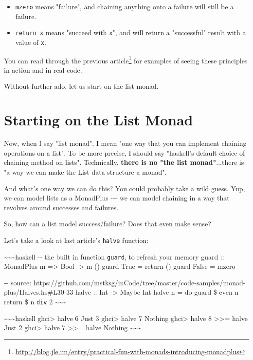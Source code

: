 \documentclass[]{article}
\renewcommand{\href}[2]{#2\footnote{\url{#1}}}
\begin{document}
\begin{itemize}
\tightlist
\item
  \texttt{mzero} means "failure", and chaining anything onto a failure will
  still be a failure.
\item
  \texttt{return\ x} means "succeed with \texttt{x}", and will return a
  "successful" result with a value of \texttt{x}.
\end{itemize}

You can read through the
\href{http://blog.jle.im/entry/practical-fun-with-monads-introducing-monadplus}{previous
article} for examples of seeing these principles in action and in real code.

Without further ado, let us start on the list monad.

\section{Starting on the List Monad}

Now, when I say "list monad", I mean "one way that you can implement chaining
operations on a list". To be more precise, I should say "haskell's default
choice of chaining method on lists". Technically, \textbf{there is no "the list
monad"}...there is "a way we can make the List data structure a monad".

And what's one way we can do this? You could probably take a wild guess. Yup, we
can model lists as a MonadPlus -\/-\/- we can model chaining in a way that
revolves around successes and failures.

So, how can a list model success/failure? Does that even make sense?

Let's take a look at last article's \texttt{halve} function:

\textasciitilde{}\textasciitilde{}\textasciitilde{}haskell -\/- the built in
function \texttt{guard}, to refresh your memory guard :: MonadPlus m
=\textgreater{} Bool -\textgreater{} m () guard True = return () guard False =
mzero

-\/- source:
https://github.com/mstksg/inCode/tree/master/code-samples/monad-plus/Halves.hs\#L30-33
halve :: Int -\textgreater{} Maybe Int halve n = do guard \$ even n return \$ n
\texttt{div} 2 \textasciitilde{}\textasciitilde{}\textasciitilde{}

\textasciitilde{}\textasciitilde{}\textasciitilde{}haskell ghci\textgreater{}
halve 6 Just 3 ghci\textgreater{} halve 7 Nothing ghci\textgreater{} halve 8
\textgreater{}\textgreater{}= halve Just 2 ghci\textgreater{} halve 7
\textgreater{}\textgreater{}= halve Nothing
\textasciitilde{}\textasciitilde{}\textasciitilde{}
\end{document}
